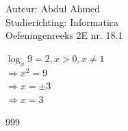 \documentclass[a4paper]{article}
\begin{document}
  
\noindent \large Auteur: Abdul Ahmed\\
\noindent \large Studierichting: Informatica\\
\noindent \large Oefeningenreeks 2E nr. 18.1\\

\medskip
\normalsize

$\log_x 9 = 2 ,x > 0, x \neq 1 $\\

$\Rightarrow x^2 = 9 $\\

$\Rightarrow x = \pm 3$\\

$\Rightarrow x = 3$\\


\begin{thebibliography}{999}
\end{thebibliography}
\end{document}
